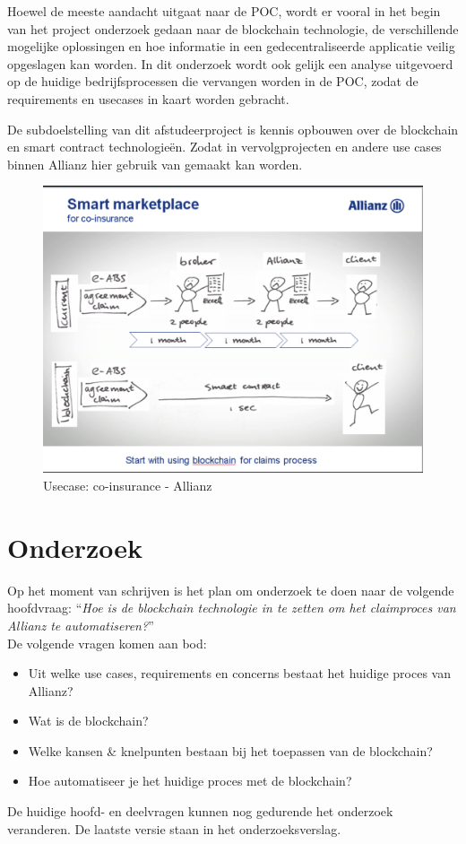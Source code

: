 Hoewel de meeste aandacht uitgaat naar de POC, wordt er vooral in het begin van het project onderzoek gedaan naar de blockchain technologie, de verschillende mogelijke oplossingen en hoe informatie in een gedecentraliseerde applicatie veilig opgeslagen kan worden. In dit onderzoek wordt ook gelijk een analyse uitgevoerd op de huidige bedrijfsprocessen die vervangen worden in de POC, zodat de requirements en usecases in kaart worden gebracht.\par

De subdoelstelling van dit afstudeerproject is kennis opbouwen over de blockchain en smart contract technologieën. Zodat in vervolgprojecten en andere use cases binnen Allianz hier gebruik van gemaakt kan worden.

\begin{figure}[h!]
    \begin{center}
        \includegraphics[scale=0.4]{images/allianz-blockchain}
        \caption{Usecase: co-insurance - Allianz}
        \label{fig:allianz-blockchain}
    \end{center}
\end{figure}

\newpage
\section{Onderzoek}
Op het moment van schrijven is het plan om onderzoek te doen naar de volgende hoofdvraag: ``\textit{Hoe is de blockchain technologie in te zetten om het claimproces van Allianz te automatiseren?}''\\
De volgende vragen komen aan bod:
\begin{itemize}
  \item Uit welke use cases, requirements en concerns bestaat het huidige proces van Allianz?
  \item Wat is de blockchain?
  \item Welke kansen \& knelpunten bestaan bij het toepassen van de blockchain?
  \item Hoe automatiseer je het huidige proces met de blockchain?
\end{itemize}
De huidige hoofd- en deelvragen kunnen nog gedurende het onderzoek veranderen. De laatste versie staan in het onderzoeksverslag.